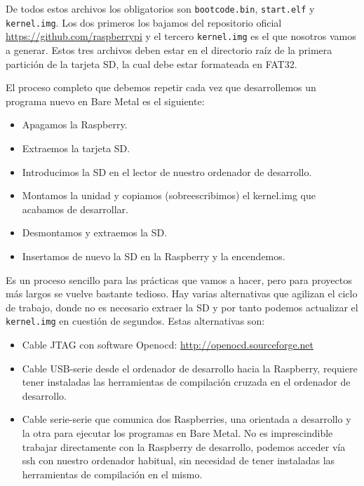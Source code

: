 De todos estos archivos los obligatorios son {\tt bootcode.bin}, {\tt start.elf} y
{\tt kernel.img}. Los dos primeros los bajamos del repositorio oficial
\textcolor{blue}{
  \href{https://github.com/raspberrypi}
  {https://github.com/raspberrypi}}
y el tercero {\tt kernel.img} es el que nosotros
vamos a generar. Estos tres archivos deben estar en el directorio raíz de la primera partición
de la tarjeta SD, la cual debe estar formateada en FAT32.

El proceso completo que debemos repetir cada vez que desarrollemos un programa nuevo
en Bare Metal es el siguiente:

\begin{itemize}
  \item Apagamos la Raspberry.
  \item Extraemos la tarjeta SD.
  \item Introducimos la SD en el lector de nuestro ordenador de desarrollo.
  \item Montamos la unidad y copiamos (sobreescribimos) el kernel.img que acabamos
        de desarrollar.
  \item Desmontamos y extraemos la SD.
  \item Insertamos de nuevo la SD en la Raspberry y la encendemos.
\end{itemize}

Es un proceso sencillo para las prácticas que vamos a hacer, pero para proyectos más largos
se vuelve bastante tedioso. Hay varias alternativas que agilizan el ciclo de
trabajo, donde no es necesario extraer la SD y por tanto podemos actualizar el {\tt kernel.img}
en cuestión de segundos. Estas alternativas son:

\begin{itemize}
  \item Cable JTAG con software Openocd:
\textcolor{blue}{
  \href{http://openocd.sourceforge.net}
  {http://openocd.sourceforge.net}}
  \item Cable USB-serie desde el ordenador de desarrollo hacia la Raspberry, requiere
        tener instaladas las herramientas de compilación cruzada en el ordenador de desarrollo.
  \item Cable serie-serie que comunica dos Raspberries, una orientada a desarrollo y la otra
        para ejecutar los programas en Bare Metal. No es imprescindible trabajar directamente
        con la Raspberry de desarrollo, podemos acceder vía ssh con nuestro ordenador habitual,
        sin necesidad de tener instaladas las herramientas de compilación en el mismo.
\end{itemize}

